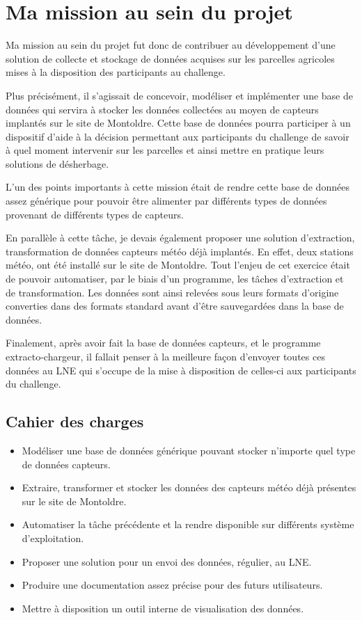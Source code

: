 \section{Ma mission au sein du projet}
Ma mission au sein du projet fut donc de contribuer au développement d’une solution de collecte et stockage de données acquises sur les parcelles agricoles mises à la disposition des participants au challenge. 

Plus précisément, il s’agissait de concevoir, modéliser et implémenter une base de données qui servira à stocker les données collectées au moyen de capteurs implantés sur le site de Montoldre. Cette base de données pourra participer à un dispositif d’aide à la décision permettant aux participants du challenge de savoir à quel moment intervenir sur les parcelles et ainsi mettre en pratique leurs solutions de désherbage.  

L’un des points importants à cette mission était de rendre cette base de données assez générique pour pouvoir être alimenter par différents types de données provenant de différents types de capteurs. 

En parallèle à cette tâche, je devais également proposer une solution d’extraction, transformation de données capteurs météo déjà implantés. En effet, deux stations météo, ont été installé sur le site de Montoldre. Tout l’enjeu de cet exercice était de pouvoir automatiser, par le biais d’un programme, les tâches d’extraction et de transformation. Les données sont ainsi relevées sous leurs formats d’origine converties dans des formats standard avant d’être sauvegardées dans la base de données. 

Finalement, après avoir fait la base de données capteurs, et le programme extracto-chargeur, il fallait penser à la meilleure façon d’envoyer toutes ces données au LNE qui s’occupe de la mise à disposition de celles-ci aux participants du challenge. 

 
\subsection{Cahier des charges}
 \begin{itemize}
      \item Modéliser une base de données générique pouvant stocker n’importe quel type de données capteurs. 
     \item Extraire, transformer et stocker les données des capteurs météo déjà présentes sur le site de Montoldre.
     \item Automatiser la tâche précédente et la rendre disponible sur différents système d’exploitation. 
     \item Proposer une solution pour un envoi des données, régulier, au LNE.
     \item Produire une documentation assez précise pour des futurs utilisateurs. 
     \item Mettre à disposition un outil interne de visualisation des données. 
 \end{itemize}

